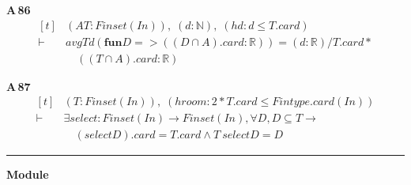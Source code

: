 \noindent\textbf{A\,86}\quad{}
{\footnotesize\[ \begin{aligned}[t]
&(\mathit{A} \mathit{T} : \mathit{Finset} (\mathit{I} \mathit{n})),\; (\mathit{d} : \mathbb{N} ),\; (\mathit{hd} : \mathit{d} \leq \mathit{T}.\mathit{card})\\
\vdash\;&\mathit{avg} \mathit{T} \mathit{d} (\mathbf{fun} \mathit{D} => ((\mathit{D} \cap \mathit{A}).\mathit{card}:\mathbb{R} )) = (\mathit{d}:\mathbb{R} )/\mathit{T}.\mathit{card}*\\
&\quad ((\mathit{T} \cap \mathit{A}).\mathit{card}:\mathbb{R} )
\end{aligned} \]}

\noindent\textbf{A\,87}\quad{}
{\footnotesize\[ \begin{aligned}[t]
&(\mathit{T} : \mathit{Finset} (\mathit{I} \mathit{n})),\; (\mathit{hroom} : 2*\mathit{T}.\mathit{card} \leq \mathit{Fintype}.\mathit{card} (\mathit{I} \mathit{n}))\\
\vdash\;&\exists \mathit{select} : \mathit{Finset} (\mathit{I} \mathit{n}) \to \mathit{Finset} (\mathit{I} \mathit{n}), \forall \mathit{D},\mathit{D} \subseteq \mathit{T} \to\\
&\quad (\mathit{select} \mathit{D}).\mathit{card}=\mathit{T}.\mathit{card} \wedge \mathit{T} \ \mathit{select} \mathit{D}=\mathit{D}
\end{aligned} \]}

\vspace{4pt}\noindent\rule{\columnwidth}{0.4pt}\par\vspace{2pt}
\noindent\textbf{Module }\par\vspace{3pt}

